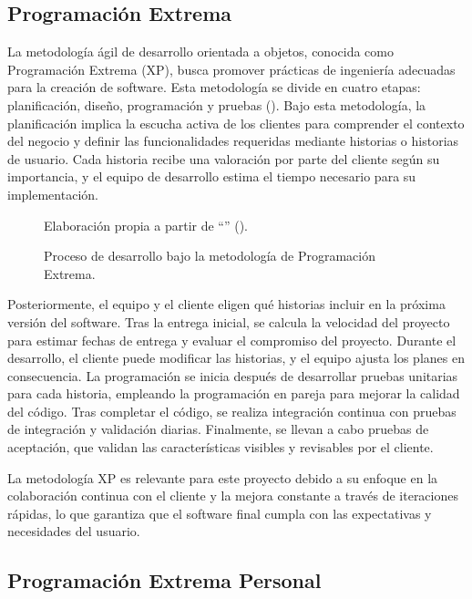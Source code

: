 \subsection{Programación Extrema}
La metodología ágil de desarrollo orientada a objetos, conocida como Programación Extrema (XP), busca promover prácticas de ingeniería adecuadas para la creación de software. Esta metodología se divide en cuatro etapas: planificación, diseño, programación y pruebas (\cite{pressman2005software}). Bajo esta metodología, la planificación implica la escucha activa de los clientes para comprender el contexto del negocio y definir las funcionalidades requeridas mediante historias o historias de usuario. Cada historia recibe una valoración por parte del cliente según su importancia, y el equipo de desarrollo estima el tiempo necesario para su implementación.
\begin{figure}[htb]
	\centering
    
    \vspace{-0.5cm}
	\caption{Proceso de desarrollo bajo la metodología de Programación Extrema.}
    \vspace{-0.2cm}
	\footnotesize{{Elaboración propia a partir de ``\textit{}'' (\citeyear{pressman2005software}).}}
	\label{fig:modelo_desarrollo_xp} 
\end{figure}
Posteriormente, el equipo y el cliente eligen qué historias incluir en la próxima versión del software. Tras la entrega inicial, se calcula la velocidad del proyecto para estimar fechas de entrega y evaluar el compromiso del proyecto. Durante el desarrollo, el cliente puede modificar las historias, y el equipo ajusta los planes en consecuencia. La programación se inicia después de desarrollar pruebas unitarias para cada historia, empleando la programación en pareja para mejorar la calidad del código. Tras completar el código, se realiza integración continua con pruebas de integración y validación diarias. Finalmente, se llevan a cabo pruebas de aceptación, que validan las características visibles y revisables por el cliente.

La metodología XP es relevante para este proyecto debido a su enfoque en la colaboración continua con el cliente y la mejora constante a través de iteraciones rápidas, lo que garantiza que el software final cumpla con las expectativas y necesidades del usuario.

\subsection{Programación Extrema Personal}

